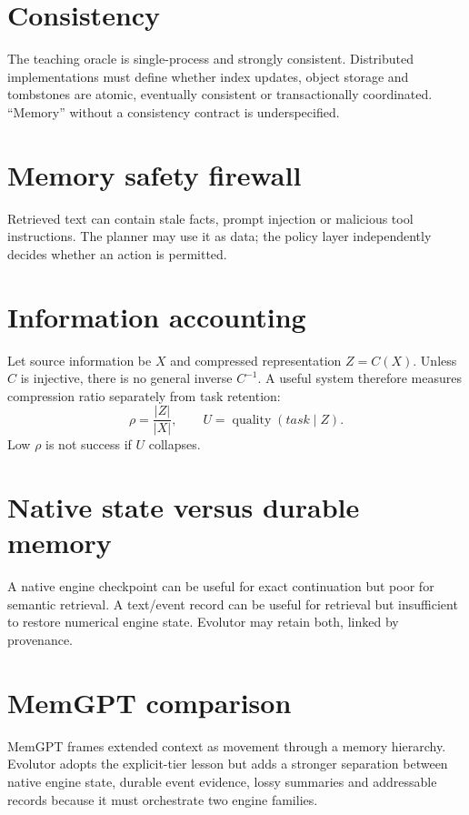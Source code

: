 \section{Consistency}
The teaching oracle is single-process and strongly consistent. Distributed implementations must define whether index updates, object storage and tombstones are atomic, eventually consistent or transactionally coordinated. ``Memory'' without a consistency contract is underspecified.

\section{Memory safety firewall}
Retrieved text can contain stale facts, prompt injection or malicious tool instructions. The planner may use it as data; the policy layer independently decides whether an action is permitted.

\section{Information accounting}
Let source information be $X$ and compressed representation $Z=C(X)$. Unless $C$ is injective, there is no general inverse $C^{-1}$. A useful system therefore measures compression ratio separately from task retention:
\[
\rho=\frac{|Z|}{|X|},\qquad
U=\operatorname{quality}(task\mid Z).
\]
Low $\rho$ is not success if $U$ collapses.

\section{Native state versus durable memory}
A native engine checkpoint can be useful for exact continuation but poor for semantic retrieval. A text/event record can be useful for retrieval but insufficient to restore numerical engine state. Evolutor may retain both, linked by provenance.

\section{MemGPT comparison}
MemGPT frames extended context as movement through a memory hierarchy. Evolutor adopts the explicit-tier lesson but adds a stronger separation between native engine state, durable event evidence, lossy summaries and addressable records because it must orchestrate two engine families.

